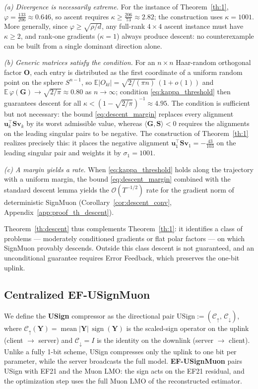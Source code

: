 \documentclass{article}
\begin{document}
\emph{(a) Divergence is necessarily extreme.} For the instance of Theorem~\ref{th:1}, $\varphi = \tfrac{133}{206} \approx 0.646$, so ascent requires $\kappa \ge \tfrac{206}{73} \approx 2.82$; the construction uses $\kappa = 1001$. More generally, since $\varphi \ge \sqrt{\rho/d}$, any full-rank $4\times4$ ascent instance must have $\kappa \ge 2$, and rank-one gradients ($\kappa = 1$) always produce descent: no counterexample can be built from a single dominant direction alone.

\emph{(b) Generic matrices satisfy the condition.} For an $n \times n$ Haar-random orthogonal factor $\mathbf{O}$, each entry is distributed as the first coordinate of a uniform random point on the sphere $S^{n-1}$, so $\mathbb{E}|O_{kl}| = \sqrt{2/(\pi n)}\,(1+o(1))$ and $\mathbb{E}\,\varphi(\mathbf{G}) \to \sqrt{2/\pi} \approx 0.80$ as $n \to \infty$; condition \eqref{eq:kappa_threshold} then guarantees descent for all $\kappa < (1-\sqrt{2/\pi})^{-1} \approx 4.95$. The condition is sufficient but not necessary: the bound \eqref{eq:descent_margin} replaces every alignment $\mathbf{u}_k^\top\mathbf{S}\mathbf{v}_k$ by its worst admissible value, whereas $\langle\mathbf{G},\mathbf{S}\rangle < 0$ requires the alignments on the leading singular pairs to be negative. The construction of Theorem~\ref{th:1} realizes precisely this: it places the negative alignment $\mathbf{u}_1^\top\mathbf{S}\mathbf{v}_1 = -\tfrac{43}{103}$ on the leading singular pair and weights it by $\sigma_1 = 1001$.

\emph{(c) A margin yields a rate.} When \eqref{eq:kappa_threshold} holds along the trajectory with a uniform margin, the bound \eqref{eq:descent_margin} combined with the standard descent lemma yields the $\mathcal{O}(T^{-1/2})$ rate for the gradient norm of deterministic SignMuon (Corollary~\ref{cor:descent_conv}, Appendix~\ref{app:proof_th_descent}).

Theorem~\ref{th:descent} thus complements Theorem~\ref{th:1}: it identifies a class of problems --- moderately conditioned gradients or flat polar factors --- on which SignMuon provably descends. Outside this class descent is not guaranteed, and an unconditional guarantee requires Error Feedback, which preserves the one-bit uplink.

\subsection{Centralized EF-USignMuon}

We define the \textbf{USign} compressor as the directional pair $\mathrm{USign} := (\mathcal{C}_{\uparrow},\, \mathcal{C}_{\downarrow})$, where $\mathcal{C}_{\uparrow}(\mathbf{Y}) = \operatorname{mean}|\mathbf{Y}|\,\operatorname{sign}(\mathbf{Y})$ is the scaled-sign operator on the uplink (client $\to$ server) and $\mathcal{C}_{\downarrow} = I$ is the identity on the downlink
(server $\to$ client). Unlike a fully 1-bit scheme, USign compresses only the uplink to one bit per parameter, while the server broadcasts the full model. \textbf{EF-USignMuon} pairs USign with EF21 and the Muon LMO: the sign acts on the EF21 residual, and the optimization step uses the full Muon LMO of the reconstructed estimator.
\end{document}
